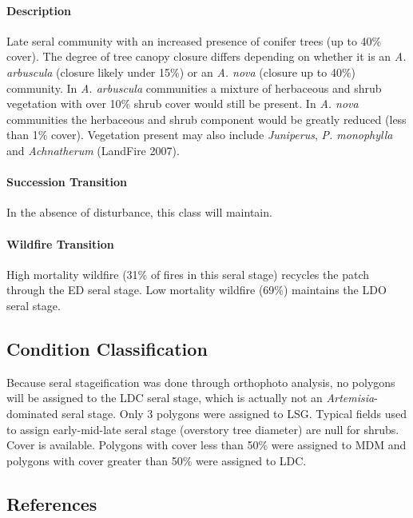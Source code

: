 \paragraph{Description} Late seral community with an increased presence of conifer trees (up to 40\% cover). The degree of tree canopy closure differs depending on whether it is an \emph{A. arbuscula} (closure likely under 15\%) or an \emph{A. nova} (closure up to 40\%) community. In \emph{A. arbuscula} communities a mixture of herbaceous and shrub vegetation with over 10\% shrub cover would still be present. In \emph{A. nova} communities the herbaceous and shrub component would be greatly reduced (less than 1\% cover). Vegetation present may also include \emph{Juniperus}, \emph{P. monophylla} and \emph{Achnatherum} (LandFire 2007).

\paragraph{Succession Transition} In the absence of disturbance, this class will maintain. 

\paragraph{Wildfire Transition} High mortality wildfire (31\% of fires in this seral stage) recycles the patch through the ED seral stage. Low mortality wildfire (69\%) maintains the LDO seral stage.

\noindent\hrulefill

\subsection*{Condition Classification}
Because seral stageification was done through orthophoto analysis, no polygons will be assigned to the LDC seral stage, which is actually not an \emph{Artemisia}-dominated seral stage. Only 3 polygons were assigned to LSG. Typical fields used to assign early-mid-late seral stage (overstory tree diameter) are null for shrubs. Cover is available. Polygons with cover less than 50\% were assigned to MDM and polygons with cover greater than 50\% were assigned to LDC.


\subsection*{References}

